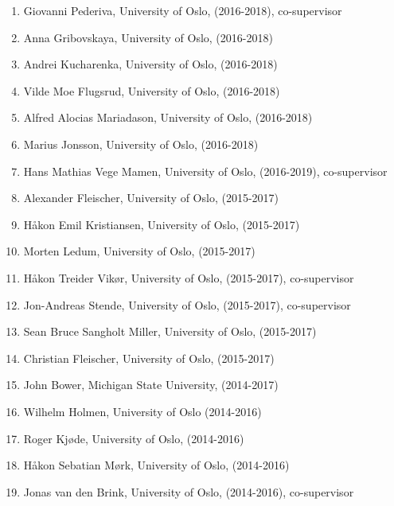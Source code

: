 \documentclass[%
oneside,                 %
final,                   %
10pt]{article}
\begin{document}
\begin{enumerate}
\item Giovanni Pederiva, University of Oslo, (2016-2018), co-supervisor

\item Anna Gribovskaya, University of Oslo, (2016-2018)

\item Andrei Kucharenka, University of Oslo, (2016-2018)

\item Vilde Moe Flugsrud, University of Oslo, (2016-2018)

\item Alfred Alocias Mariadason, University of Oslo, (2016-2018)

\item Marius Jonsson, University of Oslo, (2016-2018)

\item Hans Mathias Vege Mamen, University of Oslo, (2016-2019), co-supervisor

\item Alexander Fleischer, University of Oslo, (2015-2017)

\item Håkon Emil Kristiansen, University of Oslo, (2015-2017)

\item Morten Ledum, University of Oslo, (2015-2017)

\item Håkon Treider Vikør, University of Oslo, (2015-2017), co-supervisor

\item Jon-Andreas Stende, University of Oslo, (2015-2017), co-supervisor

\item Sean Bruce Sangholt Miller, University of Oslo, (2015-2017)

\item Christian Fleischer, University of Oslo, (2015-2017)

\item John Bower, Michigan State University, (2014-2017)

\item Wilhelm Holmen, University of Oslo (2014-2016)

\item Roger Kjøde, University of Oslo, (2014-2016)

\item Håkon Sebatian Mørk, University of Oslo, (2014-2016)

\item Jonas van den Brink, University of Oslo, (2014-2016), co-supervisor


\end{enumerate}
\end{document}
